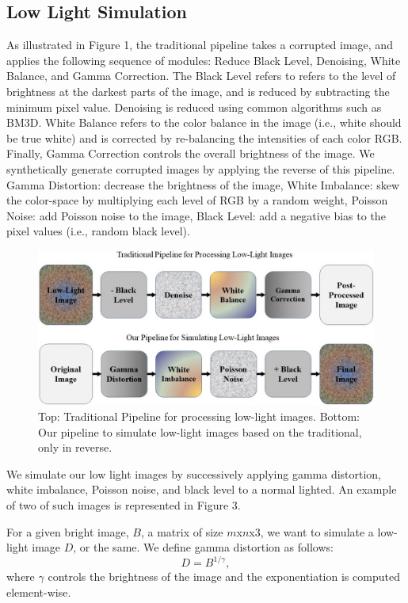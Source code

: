 \documentclass{article}
\begin{document}
\subsection{Low Light Simulation}

As illustrated in Figure 1, the traditional pipeline takes a corrupted image, and applies the following sequence of modules: Reduce Black Level, Denoising, White Balance, and Gamma Correction. The Black Level refers to refers to the level of brightness at the darkest parts of the image, and is reduced by subtracting the minimum pixel value. Denoising is reduced using common algorithms such as BM3D. White Balance refers to the color balance in the image (i.e., white should be true white) and is corrected by re-balancing the intensities of each color RGB. Finally, Gamma Correction controls the overall brightness of the image. We synthetically generate corrupted images by applying the reverse of this pipeline. Gamma Distortion: decrease the brightness of the image, White Imbalance: skew the color-space by multiplying each level of RGB by a random weight, Poisson Noise: add Poisson noise to the image, Black Level: add a negative bias to the pixel values (i.e., random black level). 

\begin{figure}[ht]
  \centering
  \includegraphics[scale=0.35]{pipeline.jpg}
  \caption{Top: Traditional Pipeline for processing low-light images. Bottom: Our  pipeline to simulate low-light images based on the traditional, only in reverse.}
\end{figure}

We simulate our low light images by successively applying gamma distortion, white imbalance, Poisson noise, and black level to a normal lighted. An example of two of such images is represented in Figure 3. 

For a given bright image, \(B\), a matrix of size \(m\)x\(n\)x3, we want to simulate a low-light image \(D\), or the same. We define gamma distortion as follows:
\[   D = {B}^{1/\gamma}, \] 
where \(\gamma\) controls the brightness of the image and the exponentiation is computed element-wise.
\end{document}
